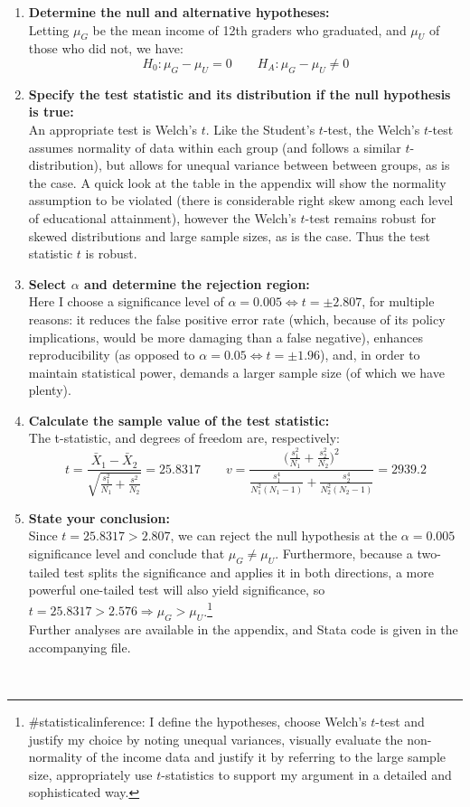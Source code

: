 \documentclass{article}
\begin{document}
\begin{enumerate}
\item \textbf{Determine the null and alternative hypotheses:} \\
Letting $\mu_G$ be the mean income of 12th graders who graduated, and $\mu_U$ of those who did not, we have:
$$ H_0: \mu_{G} - \mu_{U} = 0 \qquad H_A:\mu_G-\mu_U \neq 0$$
\item \textbf{Specify the test statistic and its distribution if the null hypothesis is true:} \\
An appropriate test is Welch's $t$. Like the Student's $t$-test, the Welch's $t$-test assumes normality of data within each group (and follows a similar $t$-distribution), but allows for unequal variance between between groups, as is the case. A quick look at the table in the appendix will show the normality assumption to be violated (there is considerable right skew among each level of educational attainment), however the Welch's $t$-test remains robust for skewed distributions and large sample sizes, as is the case. Thus the test statistic $t$ is robust.

\item \textbf{Select $\alpha$ and determine the rejection region:}\\
Here I choose a significance level of  $\alpha = 0.005 \iff t= \pm2.807$, for multiple reasons: it reduces the false positive error rate (which, because of its policy implications, would be more damaging than a false negative), enhances reproducibility (as opposed to $\alpha = 0.05 \iff t = \pm 1.96$), and, in order to maintain statistical power, demands a larger sample size (of which we have plenty).

\item \textbf{Calculate the sample value of the test statistic:}\\
The t-statistic, and degrees of freedom are, respectively:
$$ t = \frac{\bar{X}_1 - \bar{X}_2}{\sqrt{ \frac{s^2_1}{N_1} + \frac{s^2}{N_2}}} = 25.8317 \qquad v = \frac{ \big( \frac{s^2_1}{N_1} + \frac{s^2_2}{N_2}\big)^2}{\frac{s^4_1}{N^2_1 (N_1-1)} + \frac{s^4_2}{N^2_2 (N_2 - 1)}} = 2939.2$$
\item \textbf{State your conclusion:}\\
Since $t = 25.8317 > 2.807$, we can reject the null hypothesis at the $\alpha = 0.005$ significance level and conclude that $\mu_G \neq  \mu_U$. Furthermore, because a two-tailed test splits the significance and applies it in both directions, a more powerful one-tailed test will also yield significance, so $t=25.8317>2.576 \Rightarrow \mu_G > \mu_U$.\footnote{\#statisticalinference: I define the hypotheses, choose Welch's $t$-test and justify my choice by noting unequal variances, visually evaluate the non-normality of the income data and justify it by referring to the large sample size, appropriately use $t$-statistics to support my argument in a detailed and sophisticated way.} \\Further analyses are available in the appendix, and Stata code is given in the accompanying file.
\end{enumerate}
\\
\end{document}
